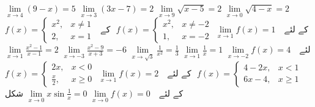 $\lim\limits_{x\to 4} (9-x)=5$
$\lim\limits_{x\to 3} (3x-7)=2$
$\lim\limits_{x\to 9} \sqrt{x-5}=2$
$\lim\limits_{x\to 0} \sqrt{4-x}=2$
$f(x)=\begin{cases} x^2,&x\ne 1\\ 2,&x=1 \end{cases}$\,\,
کے لئے \,\,
$\lim\limits_{x\to 1} f(x)=1$
$f(x)=\begin{cases} x^2,&x\ne -2\\ 1,&x=-2 \end{cases}$\,\,
کے لئے \,\,
$\lim\limits_{x\to -2} f(x)=4$
$\lim\limits_{x\to 1} \tfrac{1}{x}=1$
$\lim\limits_{x\to \sqrt{3}} \tfrac{1}{x^2}=\tfrac{1}{3}$
$\lim\limits_{x\to -3} \tfrac{x^2-9}{x+3}=-6$
$\lim\limits_{x\to 1} \tfrac{x^2-1}{x-1}=2$
$f(x)=\begin{cases} 4-2x,&x<1\\ 6x-4,&x\ge 1 \end{cases}$\,\,
کے لئے \,\,
$\lim\limits_{x\to 1} f(x)=2$
$f(x)=\begin{cases} 2x,&x<0\\  \tfrac{x}{2},&x\ge 0 \end{cases}$\,\,
کے لئے \,\,
$\lim\limits_{x\to 0} f(x)=0$
$\lim\limits_{x\to 0} x\sin \tfrac{1}{x}=0$\quad
شکل 
